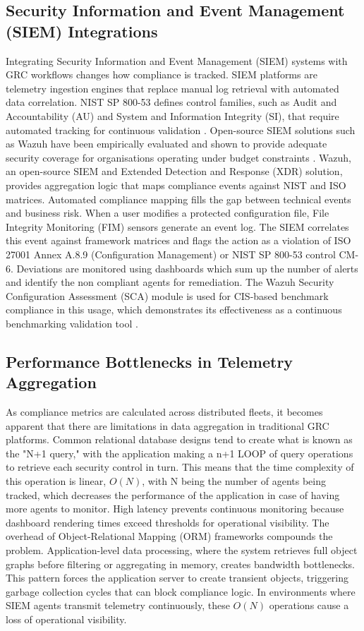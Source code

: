 \subsection{Security Information and Event Management (SIEM) Integrations}
Integrating Security Information and Event Management (SIEM) systems with GRC workflows changes how compliance is tracked. SIEM platforms are telemetry ingestion engines that replace manual log retrieval with automated data correlation. NIST SP 800-53 defines control families, such as Audit and Accountability (AU) and System and Information Integrity (SI), that require automated tracking for continuous validation \cite{nist80053r5}. Open-source SIEM solutions such as Wazuh have been empirically evaluated and shown to provide adequate security coverage for organisations operating under budget constraints \cite{jamali2024cybersecurity}. Wazuh, an open-source SIEM and Extended Detection and Response (XDR) solution, provides aggregation logic that maps compliance events against NIST and ISO matrices. Automated compliance mapping fills the gap between technical events and business risk. When a user modifies a protected configuration file, File Integrity Monitoring (FIM) sensors generate an event log. The SIEM correlates this event against framework matrices and flags the action as a violation of ISO 27001 Annex A.8.9 (Configuration Management) or NIST SP 800-53 control CM-6. Deviations are monitored using dashboards which sum up the number of alerts and identify the non compliant agents for remediation. The Wazuh Security Configuration Assessment (SCA) module is used for CIS-based benchmark compliance in this usage, which demonstrates its effectiveness as a continuous benchmarking validation tool \cite{poudel2026unified}.

\subsection{Performance Bottlenecks in Telemetry Aggregation}
As compliance metrics are calculated across distributed fleets, it becomes apparent that there are limitations in data aggregation in traditional GRC platforms. Common relational database designs tend to create what is known as the "N+1 query," with the application making a n+1 LOOP of query operations to retrieve each security control in turn. This means that the time complexity of this operation is linear, $O(N)$, with N being the number of agents being tracked, which decreases the performance of the application in case of having more agents to monitor. High latency prevents continuous monitoring because dashboard rendering times exceed thresholds for operational visibility. The overhead of Object-Relational Mapping (ORM) frameworks compounds the problem. Application-level data processing, where the system retrieves full object graphs before filtering or aggregating in memory, creates bandwidth bottlenecks. This pattern forces the application server to create transient objects, triggering garbage collection cycles that can block compliance logic. In environments where SIEM agents transmit telemetry continuously, these $O(N)$ operations cause a loss of operational visibility.

